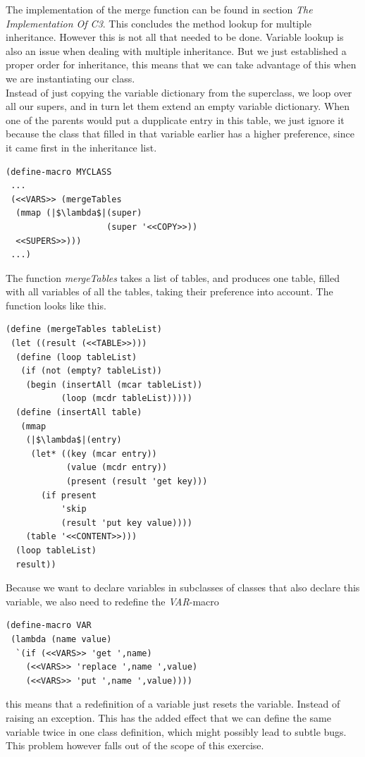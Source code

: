 \documentclass[10pt,a4paper]{scrartcl}
\begin{document}
\begin{multicols}{2}
The implementation of the merge function can be found in section \textit{The Implementation Of C3}.
This concludes the method lookup for multiple inheritance. However this is not all that needed to be done. Variable lookup is also an issue when dealing with multiple inheritance. But we just established a proper order for inheritance, this means that we can take advantage of this when we are instantiating our class.\\
Instead of just copying the variable dictionary from the superclass, we loop over all our supers, and in turn let them extend an empty variable dictionary. When one of the parents would put a dupplicate entry in this table, we just ignore it because the class that filled in that variable earlier has a higher preference, since it came first in the inheritance list.

\begin{lstlisting}[escapeinside=||]
(define-macro MYCLASS
 ...
 (<<VARS>> (mergeTables
  (mmap (|$\lambda$|(super)
                    (super '<<COPY>>))
  <<SUPERS>>)))
 ...)
\end{lstlisting}
The function \textit{mergeTables} takes a list of tables, and produces one table, filled with all variables of all the tables, taking their preference into account. The function looks like this.
\begin{lstlisting}[escapeinside=||]
(define (mergeTables tableList)
 (let ((result (<<TABLE>>)))
  (define (loop tableList)
   (if (not (empty? tableList))
    (begin (insertAll (mcar tableList))
           (loop (mcdr tableList)))))
  (define (insertAll table)
   (mmap
    (|$\lambda$|(entry)
     (let* ((key (mcar entry))
            (value (mcdr entry))
            (present (result 'get key)))
       (if present
           'skip
           (result 'put key value))))
    (table '<<CONTENT>>)))
  (loop tableList)
  result))
\end{lstlisting}
Because we want to declare variables in subclasses of classes that also declare this variable, we also need to redefine the \textit{VAR}-macro
\begin{lstlisting}
(define-macro VAR
 (lambda (name value)
  `(if (<<VARS>> 'get ',name)
    (<<VARS>> 'replace ',name ',value)
    (<<VARS>> 'put ',name ',value))))
\end{lstlisting}
this means that a redefinition of a variable just resets the variable. Instead of raising an exception. This has the added effect that we can define the same variable twice in one class definition, which might possibly lead to subtle bugs. This problem however falls out of the scope of this exercise.
\end{multicols}
\pagebreak
\end{document}
